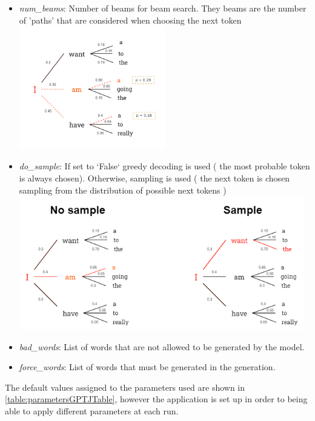 \begin{itemize}
    \item \textit{num\_beams}: Number of beams for beam search. They beams are the number of 'paths' that are considered when choosing the next token \\
    \includegraphics[width=0.5\textwidth]{images/num_beams.drawio.png}

    \item \textit{do\_sample}: If set to `False` greedy decoding is used ( the most probable token is always chosen). Otherwise, sampling is used ( the next token is chosen sampling from the distribution of possible next tokens )
    \includegraphics[width=0.98\textwidth]{images/do_sample.drawio.png}

    \item \textit{bad\_words}: List of words that are not allowed to be generated by the model.
    \item \textit{force\_words}: List of words that must be generated in the generation.
    
\end{itemize}
The default values assigned to the parameters used are shown in \autoref{table:parametersGPTJTable}, however the application is set up in order to being able to apply different parameters at each run.

